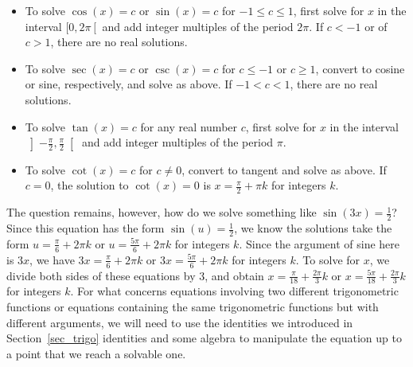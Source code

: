 \begin{itemize}

\item To solve $\cos(x) = c$ or $\sin(x) = c$ for $-1 \leq c \leq 1$, first solve for $x$ in the interval $[0,2\pi\left[\right.$ and add integer multiples of the period $2\pi$.  If $c < -1$ or of $c > 1$, there are no real solutions.

\item To solve $\sec(x) = c$ or $\csc(x) = c$ for $c \leq -1$ or $c \geq 1$,  convert to cosine or sine, respectively, and solve as above.  If $-1 < c < 1$, there are no real solutions.

\item To solve  $\tan(x) = c$ for any real number $c$,  first solve for $x$ in the interval $\left]-\frac{\pi}{2}, \frac{\pi}{2}\right[$ and add integer multiples of the period $\pi$.

\item  To solve  $\cot(x) = c$ for $c \neq 0$, convert to tangent and solve as above.  If $c = 0$, the solution to $\cot(x) = 0$ is $x = \frac{\pi}{2} + \pi k$ for integers $k$.

\end{itemize}


The question remains, however, how do we solve something like $\sin(3x) = \frac{1}{2}$?  Since this equation has the form $\sin(u) = \frac{1}{2}$, we know the solutions take the form  $u= \frac{\pi}{6} + 2\pi k$ or $u = \frac{5\pi}{6} + 2\pi k$ for integers $k$. Since the argument of sine here is $3x$, we have $3x= \frac{\pi}{6} + 2\pi k$ or $3x = \frac{5\pi}{6} + 2\pi k$ for integers $k$. To solve for $x$, we divide both sides of these equations by $3$, and obtain $x = \frac{\pi}{18} + \frac{2\pi}{3} k$ or $x = \frac{5\pi}{18} + \frac{2\pi}{3}k$ for integers $k$.  For what concerns equations involving two different trigonometric functions or  equations containing the same trigonometric functions but with different arguments, we will need to use the identities we introduced in Section~\ref{sec_trigo} identities and some algebra to manipulate the equation up to a point that we reach a solvable one.



